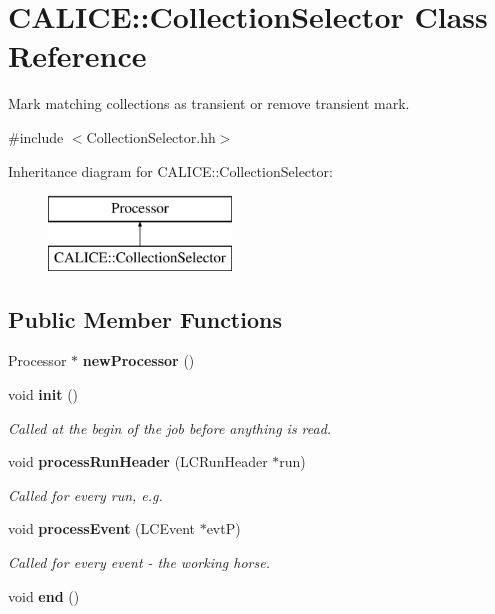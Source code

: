 \section{C\-A\-L\-I\-C\-E\-:\-:Collection\-Selector Class Reference}
\label{classCALICE_1_1CollectionSelector}


Mark matching collections as transient or remove transient mark.  




{\ttfamily \#include $<$Collection\-Selector.\-hh$>$}

Inheritance diagram for C\-A\-L\-I\-C\-E\-:\-:Collection\-Selector\-:\begin{figure}[H]
\begin{center}
\leavevmode
\includegraphics[height=2.000000cm]{classCALICE_1_1CollectionSelector}
\end{center}
\end{figure}
\subsection*{Public Member Functions}
\begin{DoxyCompactItemize}
\item 
Processor $\ast$ {\bfseries new\-Processor} ()\label{classCALICE_1_1CollectionSelector_abc7ca774dc191ae2c2e437d6932513ca}

\item 
void {\bf init} ()
\begin{DoxyCompactList}\small\item\em Called at the begin of the job before anything is read. \end{DoxyCompactList}\item 
void {\bf process\-Run\-Header} (L\-C\-Run\-Header $\ast$run)
\begin{DoxyCompactList}\small\item\em Called for every run, e.\-g. \end{DoxyCompactList}\item 
void {\bf process\-Event} (L\-C\-Event $\ast$evt\-P)\label{classCALICE_1_1CollectionSelector_a7fae16a6069ad23c39f9ea1498229f96}

\begin{DoxyCompactList}\small\item\em Called for every event -\/ the working horse. \end{DoxyCompactList}\item 
void {\bfseries end} ()\label{classCALICE_1_1CollectionSelector_a22ff69b0e61dada140f07cba6b1da38d}

\end{DoxyCompactItemize}
